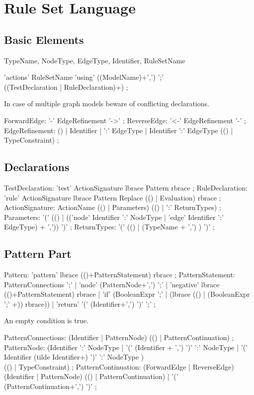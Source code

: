 \documentclass[a4paper,11pt]{report}
\begin{document}
\chapter{Rule Set Language}

\section{Basic Elements}
TypeName, NodeType, EdgeType, Identifier, RuleSetName

\begin{rail}
  'actions' RuleSetName 'using' ((ModelName)+',') ';' \\ ((TestDeclaration | RuleDeclaration)+) ;
\end{rail}
In case of multiple graph models beware of conflicting declarations.

\begin{rail}
  ForwardEdge: '-' EdgeRefinement '->' ;
  ReverseEdge: '<-' EdgeRefinement '-' ;  
  EdgeRefinement: () | Identifier | ':' EdgeType | Identifier ':' EdgeType (() | TypeConstraint) ;
\end{rail}

\section{Declarations}
\begin{rail}
  TestDeclaration: 'test' ActionSignature lbrace Pattern rbrace ;
  RuleDeclaration: 'rule' ActionSignature lbrace Pattern Replace (() | Evaluation) rbrace ;
  ActionSignature: ActionName (() | Parameters) (() | ':' ReturnTypes) ;
  Parameters: '(' (() | (('node' Identifier ':' NodeType | 'edge' Identifier ':' EdgeType) + ',')) ')' ;
  ReturnTypes: '(' (() | (TypeName + ',') ) ')' ;
\end{rail}

\section{Pattern Part}
\begin{rail}
  Pattern: 'pattern' lbrace (()+PatternStatement) rbrace ;
  PatternStatement: PatternConnections ';' |
    'node' (PatternNode+',') ';' |
    'negative' lbrace (()+PatternStatement) rbrace |
    'if' (BooleanExpr ';' | (lbrace (() | (BooleanExpr ';' +)) rbrace)) |
    'return' '(' (Identifier+',') ')' ';' ;
\end{rail} 
An empty condition is true.

\begin{rail}   
  PatternConnections: (Identifier | PatternNode) (() | PatternContinuation) ;
  PatternNode: (Identifier ':' NodeType 
    | '(' (Identifier + ',') ')' ':' NodeType
    | '(' Identifier (tilde Identifier+) ')' ':' NodeType ) \\
      (() | TypeConstraint) ; 
  PatternContinuation: (ForwardEdge | ReverseEdge) (Identifier | PatternNode) (() | PatternContinuation) |
    '(' (PatternContinuation+',') ')' ; 
\end{rail}
\end{document}
